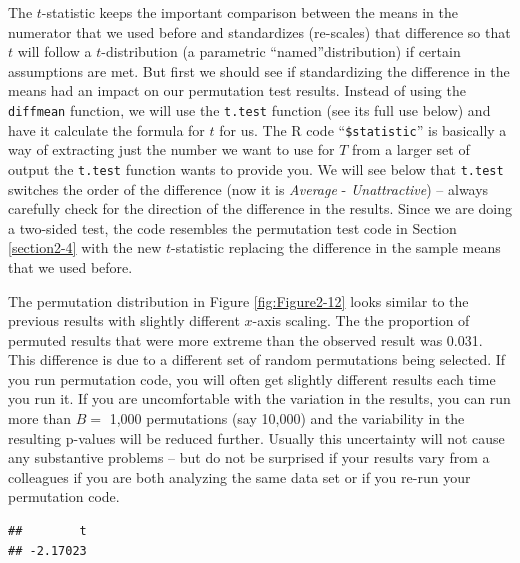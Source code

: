 \documentclass[]{book}
\newenvironment{Shaded}{\begin{snugshade}}{\end{snugshade}}
\newcommand{\KeywordTok}[1]{\textcolor[rgb]{0.13,0.29,0.53}{\textbf{{#1}}}}
\newcommand{\DataTypeTok}[1]{\textcolor[rgb]{0.13,0.29,0.53}{{#1}}}
\newcommand{\StringTok}[1]{\textcolor[rgb]{0.31,0.60,0.02}{{#1}}}
\newcommand{\NormalTok}[1]{{#1}}
\begin{document}
The \(t\)-statistic keeps the important comparison between the means in
the numerator that we used before and standardizes (re-scales) that
difference so that \(t\) will follow a \(t\)-distribution (a parametric
``named''distribution) if certain assumptions are met. But first we
should see if standardizing the difference in the means had an impact on
our permutation test results. Instead of using the \texttt{diffmean}
function, we will use the \texttt{t.test} function (see its full use
below) and have it calculate the formula for \(t\) for us. The R code
``\texttt{\$statistic}'' is basically a way of extracting just the
number we want to use for \(T\) from a larger set of output the
\texttt{t.test} function wants to provide you. We will see below that
\texttt{t.test} switches the order of the difference (now it is
\emph{Average} - \emph{Unattractive}) -- always carefully check for the
direction of the difference in the results. Since we are doing a
two-sided test, the code resembles the permutation test code in Section
\ref{section2-4} with the new \(t\)-statistic replacing the difference
in the sample means that we used before.

The permutation distribution in Figure \ref{fig:Figure2-12} looks
similar to the previous results with slightly different \(x\)-axis
scaling. The the proportion of permuted results that were more extreme
than the observed result was 0.031. This difference is due to a
different set of random permutations being selected. If you run
permutation code, you will often get slightly different results each
time you run it. If you are uncomfortable with the variation in the
results, you can run more than \(B=\) 1,000 permutations (say 10,000)
and the variability in the resulting p-values will be reduced further.
Usually this uncertainty will not cause any substantive problems -- but
do not be surprised if your results vary from a colleagues if you are
both analyzing the same data set or if you re-run your permutation code.



\begin{Shaded}
\end{Shaded}

\begin{verbatim}
##        t 
## -2.17023
\end{verbatim}
\end{document}
